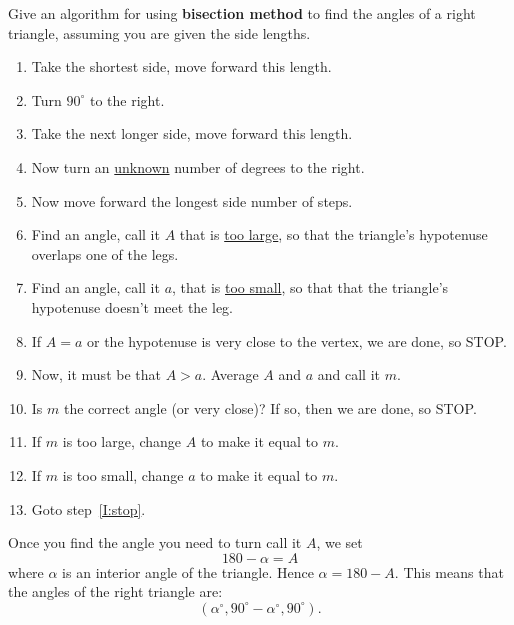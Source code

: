 \documentclass[noauthor,nooutcomes,handout,12pt]{ximera}
\begin{document}
\begin{question}
  Give an algorithm for using \textbf{bisection method} to find the angles of a
  right triangle, assuming you are given the side lengths.
  \begin{freeResponse}
    \begin{enumerate}
    \item Take the shortest side, move forward this length.
    \item Turn $90^\circ$ to the right.
    \item Take the next longer side, move forward this length.
    \item Now turn an \underline{unknown} number of degrees to the right.
    \item Now move forward the longest side number of steps.
    \item Find an angle, call it $A$ that is \underline{too large}, so
      that the triangle's hypotenuse overlaps one of the legs.
    \item Find an angle, call it $a$, that is \underline{too small},
      so that that the triangle's hypotenuse doesn't meet the leg.
    \item\label{I:stop} If $A=a$ or the hypotenuse is very close to
      the vertex, we are done, so STOP.
    \item Now, it must be that $A>a$. Average $A$ and $a$ and call it $m$.
    \item Is $m$ the correct angle (or very close)? If so, then we are done, so STOP.
    \item If $m$ is too large, change $A$ to make it equal to $m$.
    \item If $m$ is too small, change $a$ to make it equal to $m$.
    \item Goto step~\ref{I:stop}.
    \end{enumerate}
    Once you find the angle you need to turn call it $A$, we set
    \[
    180-\alpha = A
    \]
    where $\alpha$ is an interior angle of the triangle.  Hence
    $\alpha = 180-A$. This means that the angles of the right triangle
    are:
    \[
    (\alpha^\circ,90^\circ-\alpha^\circ,90^\circ).
    \]
  \end{freeResponse}
\end{question}
\end{document}
